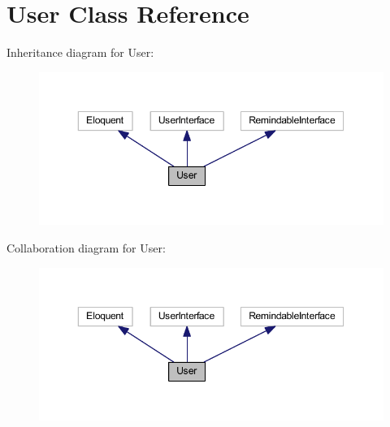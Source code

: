 \hypertarget{class_user}{}\section{User Class Reference}
\label{class_user}


Inheritance diagram for User\+:
\nopagebreak
\begin{figure}[H]
\begin{center}
\leavevmode
\includegraphics[width=350pt]{class_user__inherit__graph}
\end{center}
\end{figure}


Collaboration diagram for User\+:
\nopagebreak
\begin{figure}[H]
\begin{center}
\leavevmode
\includegraphics[width=350pt]{class_user__coll__graph}
\end{center}
\end{figure}
